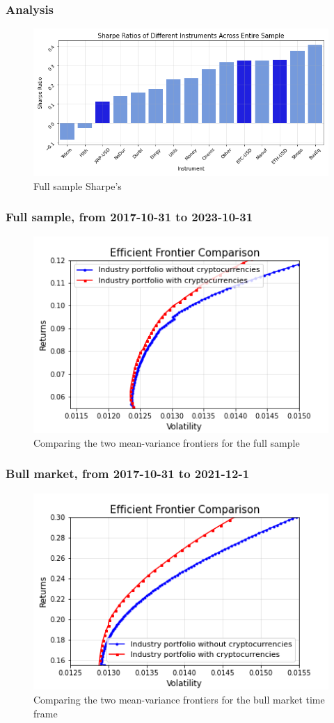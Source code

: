 \documentclass{beamer}
\begin{document}
\begin{frame}
\frametitle{Analysis}
\begin{figure}
    \centering
    \includegraphics[width=0.8\linewidth]{Figures/SR_Entire_Sample.png}
    \caption{Full sample Sharpe's}
    \label{fig:sharpe}
\end{figure}
\end{frame}

\begin{frame}
\frametitle{Full sample, from 2017-10-31 to 2023-10-31}
\begin{figure}
    \centering
    \includegraphics[width=0.8\linewidth]{Figures/Efficient_Frontier_Comparison_Full_Sample.png}
    \caption{Comparing the two mean-variance frontiers for the full sample}
    \label{fig:full}
\end{figure}
\end{frame}

\begin{frame}
\frametitle{Bull market, from 2017-10-31 to 2021-12-1}
\begin{figure}
    \centering
    \includegraphics[width=0.8\linewidth]{Figures/Efficient_Frontier_Comparison_Bull_Market.png}
    \caption{Comparing the two mean-variance frontiers for the bull market time frame}
    \label{fig:bull}
\end{figure}
\end{frame}
\end{document}
